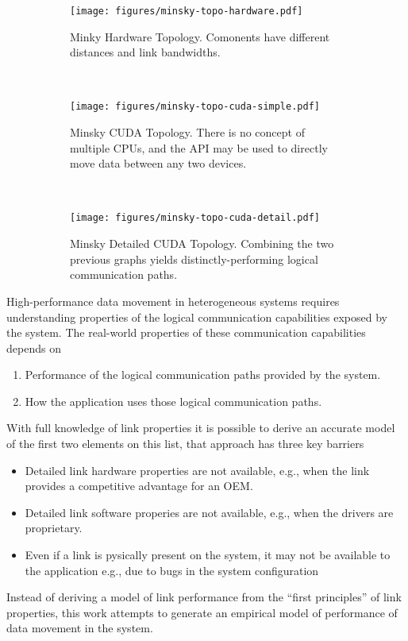 \begin{figure}[ht]
    \centering
    \begin{subfigure}[b]{0.3\textwidth}
        \texttt{[image: figures/minsky-topo-hardware.pdf]}
        \caption{Minky Hardware Topology. Comonents have different distances and link bandwidths.}
        \label{fig:minsky-topo-hardware}
    \end{subfigure}
    ~
    \begin{subfigure}[b]{0.3\textwidth}
        \texttt{[image: figures/minsky-topo-cuda-simple.pdf]}
        \caption{Minsky CUDA Topology. 
                 There is no concept of multiple CPUs, and the API may be used to directly move data between any two devices.}
        \label{fig:minsky-topo-cuda-simple}
    \end{subfigure}
    ~
    \begin{subfigure}[b]{0.3\textwidth}
        \texttt{[image: figures/minsky-topo-cuda-detail.pdf]}
        \caption{Minsky Detailed CUDA Topology.
                Combining the two previous graphs yields distinctly-performing logical communication paths.}
        \label{fig:minsky-topo-cuda-detail}
    \end{subfigure}
    \caption[]{}
    \label{fig:minsky-hardware-logical}
\end{figure}


High-performance data movement in heterogeneous systems requires understanding properties of the logical communication capabilities exposed by the system.
The real-world properties of these communication capabilities depends on 
\begin{enumerate}
    \item Performance of the logical communication paths provided by the system.
    \item How the application uses those logical communication paths.
\end{enumerate}

With full knowledge of link properties it is possible to derive an accurate model of the first two elements on this list, that approach has three key barriers
\begin{itemize}
    \item Detailed link hardware properties are not available, e.g., when the link provides a competitive advantage for an OEM.
    \item Detailed link software properies are not available, e.g., when the drivers are proprietary.
    \item Even if a link is pysically present on the system, it may not be available to the application {e.g., due to bugs in the system configuration}
\end{itemize}
Instead of deriving a model of link performance from the ``first principles'' of link properties, this work attempts to generate an empirical model of performance of data movement in the system.

